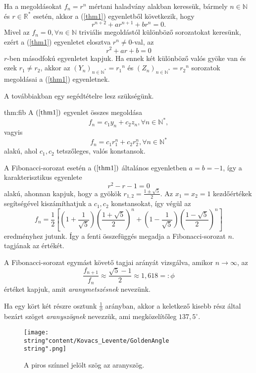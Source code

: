 \begin{solution}
Ha a megoldásokat $f_{n}=r^{n}$ mértani haladvány alakban keressük,
bármely $n\in\mathbb{N}$ és $r\in\mathbb{R}^{*}$ esetén, akkor a
(\ref{thm1}) egyenletből következik, hogy 
\[
r^{n+2}+ar^{n+1}+br^{n}=0.
\]
Mivel az $f_{n}=0,\forall n\in\mathbb{N}$ triviális megoldástól különböző
sorozatokat keresünk, ezért a (\ref{thm1}) egyenletet elosztva $r^{n}\not=0$-val,
az 
\[
r^{2}+ar+b=0
\]
$r$-ben másodfokú egyenletet kapjuk. Ha ennek két különböző valós
gyöke van és ezek $r_{1}\not=r_{2}$, akkor az $(Y_{n})_{n\in\mathbb{N^{*}}}={r_{1}}^{n}$
és $(Z_{n})_{n\in\mathbb{N^{*}}}={r_{2}}^{n}$ sorozatok megoldásai
a (\ref{thm1}) egyenletnek.

A továbbiakban egy segédtételre lesz szükségünk.
\begin{theorem}{thm:fib}
A $(\ref{thm1})$ egyenlet összes megoldása 
\[
f_{n}=c_{1}y_{n}+c_{2}z_{n},\forall n\in\mathbb{N^{*}},
\]
vagyis 
\[
f_{n}=c_{1}r_{1}^{n}+c_{2}r_{2}^{n},\forall n\in\mathbb{N^{*}}
\]
alakú, ahol $c_{1},c_{2}$ tetszőleges, valós konstansok. 
\end{theorem}

A Fibonacci-sorozat esetén a $(\ref{thm1})$ általános egyenletben
$a=b=-1$, így a karakterisztikus egyenlete 
\[
r^{2}-r-1=0
\]
alakú, ahonnan kapjuk, hogy a gyökök $r_{1,2}=\frac{1\pm\sqrt{5}}{2}$.
Az $x_{1}=x_{2}=1$ kezdőértékek segítségével kiszámíthatjuk a $c_{1},c_{2}$
konstansokat, így végül az 
\[
f_{n}=\frac{1}{2}\left[\left(1+\frac{1}{\sqrt{5}}\right)\left(\frac{1+\sqrt{5}}{2}\right)^{n}+\left(1-\frac{1}{\sqrt{5}}\right)\left(\frac{1-\sqrt{5}}{2}\right)^{n}\right]
\]
eredményhez jutunk. Így a fenti összefüggés megadja a Fibonacci-sorozat
$n.$ tagjának az értékét. 
\end{solution}
\vspace{1em}

\begin{definition}
A Fibonacci-sorozat egymást követő tagjai arányát vizsgálva, amikor
$n\rightarrow\infty$, az 
\[
\frac{f_{n+1}}{f_{n}}\approx\frac{\sqrt{5}-1}{2}\approx1,618=:\phi
\]
értéket kapjuk, amit \textit{aranymetszésnek} nevezünk.
\end{definition}
Ha egy kört két részre osztunk $\frac{1}{\phi}$ arányban, akkor a
keletkező kisebb rész által bezárt szöget \textit{aranyszögnek} nevezzük,
ami megközelítőleg $137,5^{\circ}$.

\begin{figure}[h]
\centering \texttt{[image: \\string"content/Kovacs\_Levente/GoldenAngle\\string".png]}
\caption{A piros színnel jelölt szög az aranyszög.}
\label{fig1} 
\end{figure}


